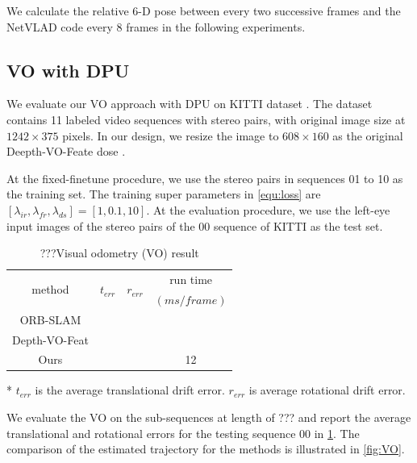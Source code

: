 We calculate the relative 6-D pose between every two successive frames and the NetVLAD code every $8$ frames in the following experiments.

\subsection{VO with DPU}

We evaluate our VO approach with DPU on KITTI dataset \cite{geiger2013vision}. The dataset contains 11 labeled video sequences with stereo pairs, with original image size at $1242 \times 375$ pixels. In our design, we resize the image to $608 \times 160$ as the original Deepth-VO-Feate dose \cite{Zhan:2018e92}.

At the fixed-finetune procedure, we use the stereo pairs in sequences 01 to 10 as the training set. The training  super parameters in \cref{equ:loss} are $[\lambda_{ir},\lambda_{fr},\lambda_{ds}] = [1,0.1,10]$. At the evaluation procedure, we use the left-eye input images of the stereo pairs of the 00 sequence of KITTI as the test set.


\begin{table}[ht]
    \centering
    \caption{???Visual odometry (VO) result}
    \footnotesize
    \begin{threeparttable}
\begin{tabular}{|c|c|c|c|}
  \hline
  \multirow{2}[2]{*}{method} & \multirow{2}[2]{*}{$t_{err}$} & \multirow{2}[2]{*}{$r_{err}$} & run time  \bigstrut[t]\\
        &       &       & $(ms/frame)$ \bigstrut[b]\\
  \hline
  ORB-SLAM  &       &       &  \bigstrut\\
  \hline
  Depth-VO-Feat &       &       &  \bigstrut\\
  \hline
  Ours  &       &       & 12 \bigstrut\\
  \hline
  \end{tabular}%
  
  \begin{tablenotes}
        \item[*] $t_{err}$ is the average translational drift error. $r_{err}$ is average rotational drift error.
        \end{tablenotes}
      \end{threeparttable}
    \label{tab:VO}%
  \end{table}%

  We evaluate the VO on the sub-sequences at length of ??? and report the average translational and rotational errors for the testing sequence 00 in \cref{tab:VO}.  The comparison of the estimated trajectory for the methods is illustrated in \cref{fig:VO}.


